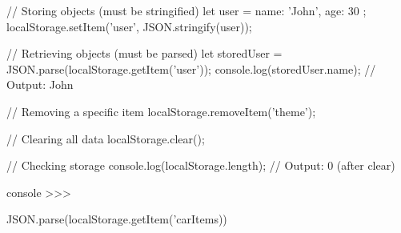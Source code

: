 // Storing objects (must be stringified)
let user = { name: 'John', age: 30 };
localStorage.setItem('user', JSON.stringify(user));

// Retrieving objects (must be parsed)
let storedUser = JSON.parse(localStorage.getItem('user'));
console.log(storedUser.name); // Output: John

// Removing a specific item
localStorage.removeItem('theme');

// Clearing all data
localStorage.clear();

// Checking storage
console.log(localStorage.length); // Output: 0 (after clear)





console >>>

JSON.parse(localStorage.getItem('carItems))
